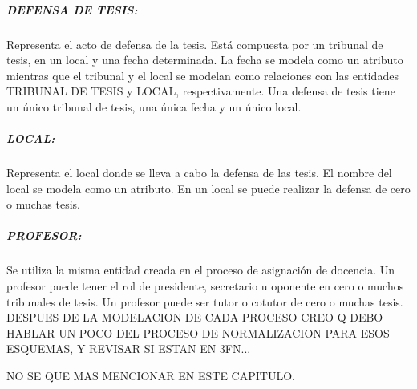 \subparagraph{DEFENSA DE TESIS:}
Representa el acto de defensa de la tesis. 
Está compuesta por un tribunal de tesis, en un local y una 
fecha determinada. La fecha se modela como un atributo mientras que 
el tribunal y el local se modelan como relaciones con las entidades TRIBUNAL DE 
TESIS y LOCAL, respectivamente. Una defensa de tesis tiene un único tribunal de tesis,
una única fecha y un único local.



\subparagraph{LOCAL:}
Representa el local donde se lleva a cabo la defensa de las tesis.
El nombre del local se modela como un atributo. 
En un local se puede realizar la defensa de cero o muchas tesis.


\subparagraph{PROFESOR:}
Se utiliza la misma entidad creada en el proceso de asignación de docencia.
Un profesor puede tener el rol de presidente, secretario u oponente en cero o 
muchos tribunales de tesis. Un profesor puede ser 
tutor o cotutor de cero o muchas tesis. \\


DESPUES DE LA MODELACION DE CADA PROCESO CREO Q DEBO HABLAR UN 
POCO DEL PROCESO DE NORMALIZACION PARA ESOS ESQUEMAS, Y REVISAR SI 
ESTAN EN 3FN... 

NO SE QUE MAS MENCIONAR EN ESTE CAPITULO.


